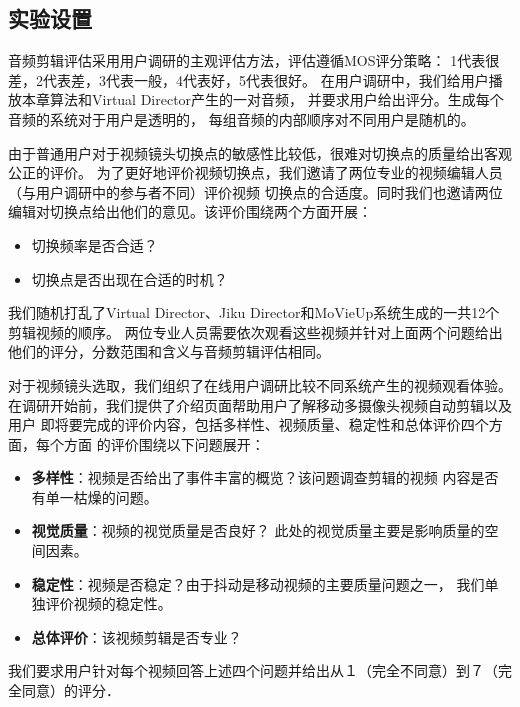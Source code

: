 \documentclass[doctor]{ustcthesis}
\begin{document}
\vspace{-0.5em}
\subsection{实验设置}
音频剪辑评估采用用户调研的主观评估方法，评估遵循MOS评分策略：
1代表很差，2代表差，3代表一般，4代表好，5代表很好。
在用户调研中，我们给用户播放本章算法和Virtual Director产生的一对音频，
并要求用户给出评分。生成每个音频的系统对于用户是透明的，
每组音频的内部顺序对不同用户是随机的。

由于普通用户对于视频镜头切换点的敏感性比较低，很难对切换点的质量给出客观公正的评价。
为了更好地评价视频切换点，我们邀请了两位专业的视频编辑人员（与用户调研中的参与者不同）评价视频
切换点的合适度。同时我们也邀请两位编辑对切换点给出他们的意见。该评价围绕两个方面开展：
\vspace{-0.3em}
\begin{itemize}\setlength{\itemsep}{-0.3em}
    \item 切换频率是否合适？
    \item 切换点是否出现在合适的时机？
\end{itemize}

我们随机打乱了Virtual Director、Jiku Director和MoVieUp系统生成的一共12个剪辑视频的顺序。
两位专业人员需要依次观看这些视频并针对上面两个问题给出他们的评分，分数范围和含义与音频剪辑评估相同。

对于视频镜头选取，我们组织了在线用户调研比较不同系统产生的视频观看体验。
在调研开始前，我们提供了介绍页面帮助用户了解移动多摄像头视频自动剪辑以及用户
即将要完成的评价内容，包括多样性、视频质量、稳定性和总体评价四个方面，每个方面
的评价围绕以下问题展开：
\begin{itemize}\setlength{\itemsep}{-0.3em}
    \item \textbf{多样性}：视频是否给出了事件丰富的概览？该问题调查剪辑的视频
        内容是否有单一枯燥的问题。
    \item \textbf{视觉质量}：视频的视觉质量是否良好？
        此处的视觉质量主要是影响质量的空间因素。
    \item \textbf{稳定性}：视频是否稳定？由于抖动是移动视频的主要质量问题之一，
        我们单独评价视频的稳定性。
    \item \textbf{总体评价}：该视频剪辑是否专业？
\end{itemize}
我们要求用户针对每个视频回答上述四个问题并给出从１（完全不同意）到７（完全同意）的评分．
\end{document}
